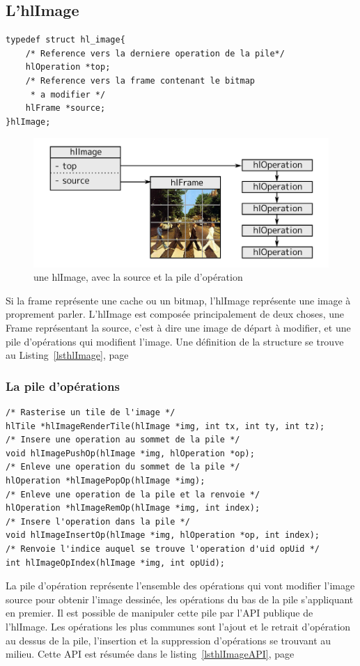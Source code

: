 		\subsection{L'hlImage}
		\begin{lstlisting}[float,caption={Définition des hlImages },frame=tb,label=lsthlImage]
typedef struct hl_image{
	/* Reference vers la derniere operation de la pile*/
	hlOperation *top;
	/* Reference vers la frame contenant le bitmap 
	 * a modifier */
	hlFrame *source;
}hlImage;
		\end{lstlisting}
		\begin{figure}[h]
			\centering
			\includegraphics[width=\textwidth]{images/hlImage1} 
			\caption{une hlImage, avec la source et la pile d'opération}
			\label{fig:hlImage1}
		\end{figure}
		Si la frame représente une cache ou un bitmap, l'hlImage représente une image à proprement parler. L'hlImage est composée principalement
		de deux choses, une Frame représentant la source, c'est à dire une image de départ à modifier, et une pile d'opérations
		qui modifient l'image.	
		Une définition de la structure se trouve au Listing~\ref{lsthlImage}, page~\pageref{lsthlImage} 

		\subsubsection{La pile d'opérations}
		\begin{lstlisting}[float,caption={API des hlImages },frame=tb,label=lsthlImageAPI]
/* Rasterise un tile de l'image */
hlTile *hlImageRenderTile(hlImage *img, int tx, int ty, int tz);
/* Insere une operation au sommet de la pile */
void hlImagePushOp(hlImage *img, hlOperation *op);
/* Enleve une operation du sommet de la pile */
hlOperation *hlImagePopOp(hlImage *img);
/* Enleve une operation de la pile et la renvoie */
hlOperation *hlImageRemOp(hlImage *img, int index);
/* Insere l'operation dans la pile */
void hlImageInsertOp(hlImage *img, hlOperation *op, int index);
/* Renvoie l'indice auquel se trouve l'operation d'uid opUid */
int hlImageOpIndex(hlImage *img, int opUid);
		\end{lstlisting}
			La pile d'opération représente l'ensemble des opérations qui vont modifier l'image source pour obtenir l'image dessinée, les opérations
			du bas de la pile s'appliquant en premier. Il est
			possible de manipuler cette pile par l'API publique de l'hlImage. Les opérations les plus communes sont l'ajout et le retrait d'opération
			au dessus de la pile, l'insertion et la suppression d'opérations se trouvant au  milieu. Cette API est résumée dans le 
			listing~\ref{lsthlImageAPI}, page~\pageref{lsthlImageAPI}


